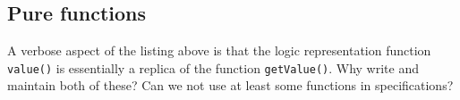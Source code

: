%
%
%	
%	
%	
%	
%	
%	
%
%
%

\subsection{Pure functions}
\label{sec:pure}
A verbose aspect of the listing above is that the logic representation function \lstinline|value()| is essentially a replica of
the \lang{} function \lstinline|getValue()|. Why write and maintain both of these? Can we not use at least some \lang{} functions in 
specifications?

